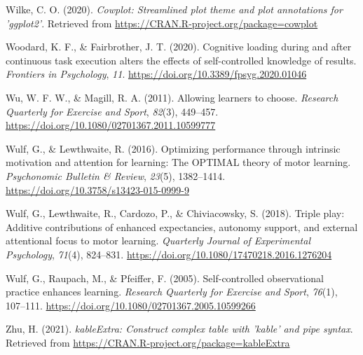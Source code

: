 \documentclass[
  english,
  man, donotrepeattitle,floatsintext]{apa7}
\newlength{\cslhangindent}
\newlength{\cslentryspacingunit} %
\newenvironment{CSLReferences}[2] %
 {%
  \setlength{\parindent}{0pt}
  \ifodd #1
  \let\oldpar\par
  \def\par{\hangindent=\cslhangindent\oldpar}
  \fi
  \setlength{\parskip}{#2\cslentryspacingunit}
 }%
 {}
\begin{document}
\begin{CSLReferences}{1}{0}
\leavevmode{}%
Wilke, C. O. (2020). \emph{Cowplot: Streamlined plot theme and plot annotations for 'ggplot2'}. Retrieved from \url{https://CRAN.R-project.org/package=cowplot}

\leavevmode{}%
Woodard, K. F., \& Fairbrother, J. T. (2020). Cognitive loading during and after continuous task execution alters the effects of self-controlled knowledge of results. \emph{Frontiers in Psychology}, \emph{11}. \url{https://doi.org/10.3389/fpsyg.2020.01046}

\leavevmode{}%
Wu, W. F. W., \& Magill, R. A. (2011). Allowing learners to choose. \emph{Research Quarterly for Exercise and Sport}, \emph{82}(3), 449--457. \url{https://doi.org/10.1080/02701367.2011.10599777}

\leavevmode{}%
Wulf, G., \& Lewthwaite, R. (2016). Optimizing performance through intrinsic motivation and attention for learning: The OPTIMAL theory of motor learning. \emph{Psychonomic Bulletin \& Review}, \emph{23}(5), 1382--1414. \url{https://doi.org/10.3758/s13423-015-0999-9}

\leavevmode{}%
Wulf, G., Lewthwaite, R., Cardozo, P., \& Chiviacowsky, S. (2018). Triple play: Additive contributions of enhanced expectancies, autonomy support, and external attentional focus to motor learning. \emph{Quarterly Journal of Experimental Psychology}, \emph{71}(4), 824--831. \url{https://doi.org/10.1080/17470218.2016.1276204}

\leavevmode{}%
Wulf, G., Raupach, M., \& Pfeiffer, F. (2005). Self-controlled observational practice enhances learning. \emph{Research Quarterly for Exercise and Sport}, \emph{76}(1), 107--111. \url{https://doi.org/10.1080/02701367.2005.10599266}

\leavevmode{}%
Zhu, H. (2021). \emph{kableExtra: Construct complex table with 'kable' and pipe syntax}. Retrieved from \url{https://CRAN.R-project.org/package=kableExtra}

\end{CSLReferences}
\end{document}
